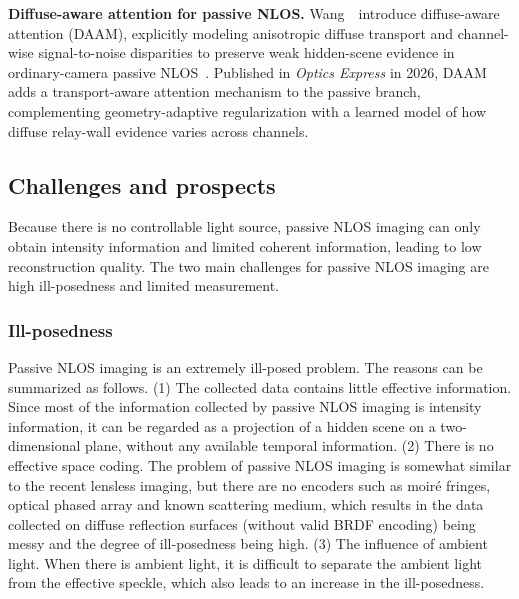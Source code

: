 \vspace{0.8mm}
\noindent \textbf{Diffuse-aware attention for passive NLOS.}
Wang~\etal~introduce diffuse-aware attention (DAAM), explicitly modeling anisotropic diffuse transport and channel-wise signal-to-noise disparities to preserve weak hidden-scene evidence in ordinary-camera passive NLOS~\cite{wangDAAMPassiveNLOS2026}. Published in \emph{Optics Express} in 2026, DAAM adds a transport-aware attention mechanism to the passive branch, complementing geometry-adaptive regularization with a learned model of how diffuse relay-wall evidence varies across channels.

\subsection{Challenges and prospects}
Because there is no controllable light source, passive NLOS imaging can only obtain intensity information and limited coherent information, leading to low reconstruction quality. The two main challenges for passive NLOS imaging are high ill-posedness and limited measurement.

\subsubsection{Ill-posedness}
Passive NLOS imaging is an extremely ill-posed problem. The reasons can be summarized as follows. (1) The collected data contains little effective information. Since most of the information collected by passive NLOS imaging is intensity information, it can be regarded as a projection of a hidden scene on a two-dimensional plane, without any available temporal information. (2) There is no effective space coding. The problem of passive NLOS imaging is somewhat similar to the recent lensless imaging, but there are no encoders such as moiré fringes\cite{tajima_lensless_2017}, optical phased array\cite{fatemi_88_2017} and known scattering medium\cite{sahoo_single-shot_2017}, which results in the data collected on diffuse reflection surfaces (without valid BRDF encoding) being messy and the degree of ill-posedness being high. (3) The influence of ambient light. When there is ambient light, it is difficult to separate the ambient light from the effective speckle, which also leads to an increase in the ill-posedness\cite{maedaRecentAdvancesImaging2019}.

